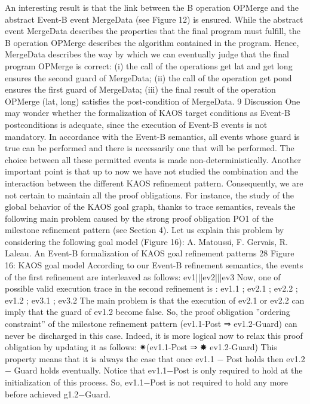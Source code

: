 An interesting result is that the link between the B operation OPMerge and the abstract
Event-B event MergeData (see Figure 12) is ensured. While the abstract event MergeData
describes the properties that the final program must fulfill, the B operation OPMerge
describes the algorithm contained in the program. Hence, MergeData describes the way by
which we can eventually judge that the final program OPMerge is correct: (i) the call of
the operations get lat and get long ensures the second guard of MergeData; (ii) the call
of the operation get pond ensures the first guard of MergeData; (iii) the final result of the
operation OPMerge (lat, long) satisfies the post-condition of MergeData.
9 Discussion
One may wonder whether the formalization of KAOS target conditions as Event-B postconditions is adequate, since the execution of Event-B events is not mandatory. In accordance
with the Event-B semantics, all events whose guard is true can be performed and there is
necessarily one that will be performed. The choice between all these permitted events is made
non-deterministically.
Another important point is that up to now we have not studied the combination and the
interaction between the different KAOS refinement pattern. Consequently, we are not certain
to maintain all the proof obligations. For instance, the study of the global behavior of the
KAOS goal graph, thanks to trace semantics, reveals the following main problem caused by
the strong proof obligation PO1 of the milestone refinement pattern (see Section 4). Let us
explain this problem by considering the following goal model (Figure 16):
A. Matoussi, F. Gervais, R. Laleau. An Event-B formalization of KAOS goal refinement patterns 28
Figure 16: KAOS goal model
According to our Event-B refinement semantics, the events of the first refinement are
interleaved as follows:
ev1|||ev2|||ev3
Now, one of possible valid execution trace in the second refinement is :
ev1.1 ; ev2.1 ; ev2.2 ; ev1.2 ; ev3.1 ; ev3.2
The main problem is that the execution of ev2.1 or ev2.2 can imply that the guard of
ev1.2 become false. So, the proof obligation ”ordering constraint” of the milestone refinement
pattern (ev1.1-Post ⇒ ev1.2-Guard) can never be discharged in this case. Indeed, it is more
logical now to relax this proof obligation by updating it as follows:
✷(ev1.1-Post ⇒ ✸ ev1.2-Guard)
This property means that it is always the case that once ev1.1 − Post holds then ev1.2 −
Guard holds eventually. Notice that ev1.1−Post is only required to hold at the initialization
of this process. So, ev1.1−Post is not required to hold any more before achieved g1.2−Guard.
